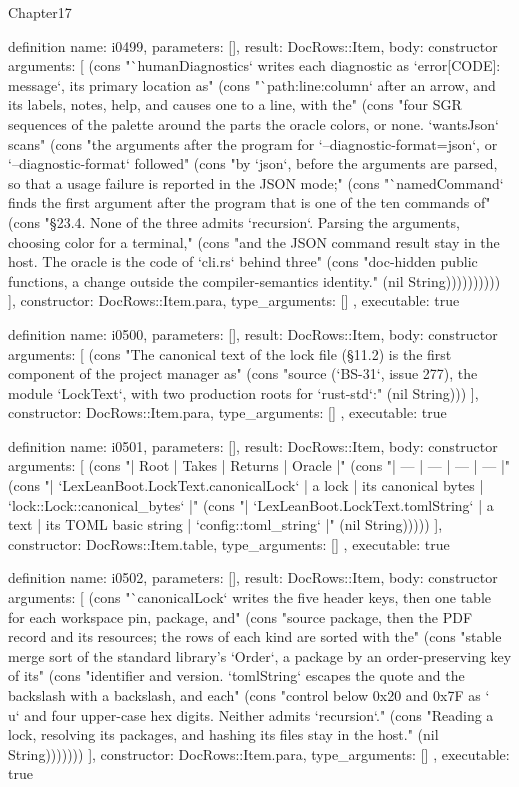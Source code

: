 \begin{lexlean}{Chapter17}
\begin{semanticmodule}
definition{
  name: i0499,
  parameters: [],
  result: DocRows::Item,
  body: constructor{
    arguments: [
      (cons "`humanDiagnostics` writes each diagnostic as `error[CODE]: message`, its primary location as" (cons "`path:line:column` after an arrow, and its labels, notes, help, and causes one to a line, with the" (cons "four SGR sequences of the palette around the parts the oracle colors, or none. `wantsJson` scans" (cons "the arguments after the program for `--diagnostic-format=json`, or `--diagnostic-format` followed" (cons "by `json`, before the arguments are parsed, so that a usage failure is reported in the JSON mode;" (cons "`namedCommand` finds the first argument after the program that is one of the ten commands of" (cons "§23.4. None of the three admits `recursion`. Parsing the arguments, choosing color for a terminal," (cons "and the JSON command result stay in the host. The oracle is the code of `cli.rs` behind three" (cons "doc-hidden public functions, a change outside the compiler-semantics identity." (nil String))))))))))
    ],
    constructor: DocRows::Item.para,
    type_arguments: []
  },
  executable: true
}

definition{
  name: i0500,
  parameters: [],
  result: DocRows::Item,
  body: constructor{
    arguments: [
      (cons "The canonical text of the lock file (§11.2) is the first component of the project manager as" (cons "source (`BS-31`, issue 277), the module `LockText`, with two production roots for `rust-std`:" (nil String)))
    ],
    constructor: DocRows::Item.para,
    type_arguments: []
  },
  executable: true
}

definition{
  name: i0501,
  parameters: [],
  result: DocRows::Item,
  body: constructor{
    arguments: [
      (cons "| Root | Takes | Returns | Oracle |" (cons "| --- | --- | --- | --- |" (cons "| `LexLeanBoot.LockText.canonicalLock` | a lock | its canonical bytes | `lock::Lock::canonical_bytes` |" (cons "| `LexLeanBoot.LockText.tomlString` | a text | its TOML basic string | `config::toml_string` |" (nil String)))))
    ],
    constructor: DocRows::Item.table,
    type_arguments: []
  },
  executable: true
}

definition{
  name: i0502,
  parameters: [],
  result: DocRows::Item,
  body: constructor{
    arguments: [
      (cons "`canonicalLock` writes the five header keys, then one table for each workspace pin, package, and" (cons "source package, then the PDF record and its resources; the rows of each kind are sorted with the" (cons "stable merge sort of the standard library's `Order`, a package by an order-preserving key of its" (cons "identifier and version. `tomlString` escapes the quote and the backslash with a backslash, and each" (cons "control below 0x20 and 0x7F as `\\u` and four upper-case hex digits. Neither admits `recursion`." (cons "Reading a lock, resolving its packages, and hashing its files stay in the host." (nil String)))))))
    ],
    constructor: DocRows::Item.para,
    type_arguments: []
  },
  executable: true
}


\end{semanticmodule}
\end{lexlean}
